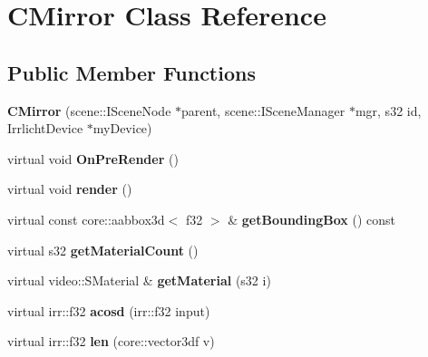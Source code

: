 \hypertarget{class_c_mirror}{
\section{CMirror Class Reference}
\label{class_c_mirror}
}
\subsection*{Public Member Functions}
\begin{DoxyCompactItemize}
\item 
\hypertarget{class_c_mirror_a7e1c8089548260433d495a86aec4ae18}{
{\bfseries CMirror} (scene::ISceneNode $\ast$parent, scene::ISceneManager $\ast$mgr, s32 id, IrrlichtDevice $\ast$myDevice)}
\label{class_c_mirror_a7e1c8089548260433d495a86aec4ae18}

\item 
\hypertarget{class_c_mirror_a01f791f377d9af17ca84e3870c9a6512}{
virtual void {\bfseries OnPreRender} ()}
\label{class_c_mirror_a01f791f377d9af17ca84e3870c9a6512}

\item 
\hypertarget{class_c_mirror_ae381ad0b799f0327083e0dd090080c71}{
virtual void {\bfseries render} ()}
\label{class_c_mirror_ae381ad0b799f0327083e0dd090080c71}

\item 
\hypertarget{class_c_mirror_acb6fd4f37b909270cb319191c0376d4c}{
virtual const core::aabbox3d$<$ f32 $>$ \& {\bfseries getBoundingBox} () const }
\label{class_c_mirror_acb6fd4f37b909270cb319191c0376d4c}

\item 
\hypertarget{class_c_mirror_ac91be21a82f11c8055ab13b79920cde4}{
virtual s32 {\bfseries getMaterialCount} ()}
\label{class_c_mirror_ac91be21a82f11c8055ab13b79920cde4}

\item 
\hypertarget{class_c_mirror_adad60dceb5e19f88b1e53a4cd7ee87e8}{
virtual video::SMaterial \& {\bfseries getMaterial} (s32 i)}
\label{class_c_mirror_adad60dceb5e19f88b1e53a4cd7ee87e8}

\item 
\hypertarget{class_c_mirror_ab498adbc37d3418505c3eeef0b020b58}{
virtual irr::f32 {\bfseries acosd} (irr::f32 input)}
\label{class_c_mirror_ab498adbc37d3418505c3eeef0b020b58}

\item 
\hypertarget{class_c_mirror_a3b24e5abf24deb70196591970f471575}{
virtual irr::f32 {\bfseries len} (core::vector3df v)}
\label{class_c_mirror_a3b24e5abf24deb70196591970f471575}


\end{DoxyCompactItemize}
